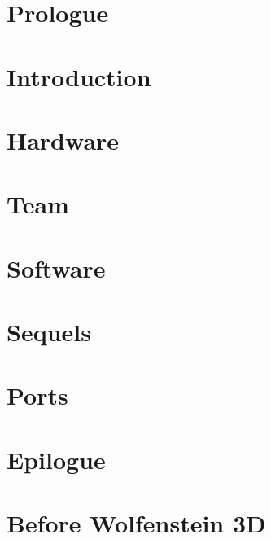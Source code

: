 \documentclass[8pt]{book}
\begin{document}
    \pagebreak


    \chapter*{Prologue}
      


    \chapter{Introduction}
      
  
    \chapter{Hardware}
      

  
    \chapter{Team}
      
      
    \chapter{Software}
       
       
      
       
       
      
       
    
  
           


\chapter{Sequels}
        
        

    \chapter{Ports}        
        
        
    
       \chapter{Epilogue}
        

        \appendix
    \appendixpage

\chapter{Before Wolfenstein 3D}
        
    
\end{document}
